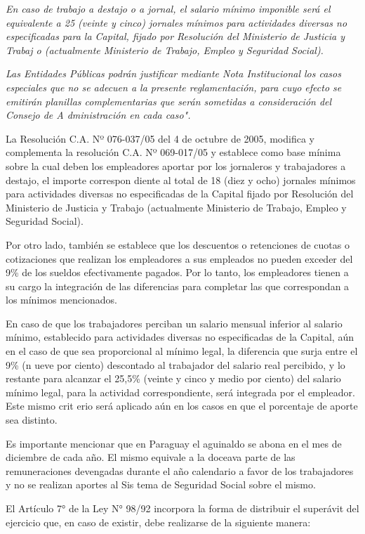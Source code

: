\textit{En caso de trabajo a destajo o a jornal, el salario mínimo imponible será el equivalente a 25 (veinte y cinco) jornales mínimos para actividades diversas no especificadas para la Capital, fijado por Resolución del Ministerio de Justicia y Trabaj
o (actualmente Ministerio de Trabajo, Empleo y Seguridad Social).}

\textit{Las Entidades Públicas podrán justificar mediante Nota Institucional los casos especiales que no se adecuen a la presente reglamentación, para cuyo efecto se emitirán planillas complementarias que serán sometidas a consideración del Consejo de A
dministración en cada caso".}

La Resolución C.A. Nº 076-037/05 del 4 de octubre de 2005, modifica y
complementa la resolución C.A. Nº 069-017/05 y establece como base
mínima sobre la cual deben los empleadores aportar por los jornaleros y
trabajadores a destajo, el importe correspon diente al total de 18 (diez
y ocho) jornales mínimos para actividades diversas no especificadas de
la Capital fijado por Resolución del Ministerio de Justicia y Trabajo
(actualmente Ministerio de Trabajo, Empleo y Seguridad Social).

Por otro lado, también se establece que los descuentos o retenciones de
cuotas o cotizaciones que realizan los empleadores a sus empleados no
pueden exceder del 9\% de los sueldos efectivamente pagados. Por lo
tanto, los empleadores tienen a su cargo la integración de las
diferencias para completar las que correspondan a los mínimos
mencionados.

En caso de que los trabajadores perciban un salario mensual inferior al
salario mínimo, establecido para actividades diversas no especificadas
de la Capital, aún en el caso de que sea proporcional al mínimo legal,
la diferencia que surja entre el 9\% (n ueve por ciento) descontado al
trabajador del salario real percibido, y lo restante para alcanzar el
25,5\% (veinte y cinco y medio por ciento) del salario mínimo legal,
para la actividad correspondiente, será integrada por el empleador. Este
mismo crit erio será aplicado aún en los casos en que el porcentaje de
aporte sea distinto.

Es importante mencionar que en Paraguay el aguinaldo se abona en el mes
de diciembre de cada año. El mismo equivale a la doceava parte de las
remuneraciones devengadas durante el año calendario a favor de los
trabajadores y no se realizan aportes al Sis tema de Seguridad Social
sobre el mismo.

El Artículo 7° de la Ley N° 98/92 incorpora la forma de distribuir el
superávit del ejercicio que, en caso de existir, debe realizarse de la
siguiente manera:

